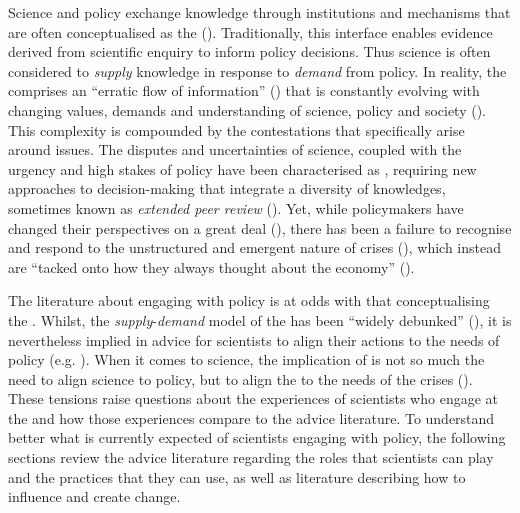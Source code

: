 Science and policy exchange knowledge through institutions and mechanisms that are often conceptualised as the \SPI{} (\cite{JagannathanEtAl2023}). 
Traditionally, this interface enables %
evidence derived from scientific enquiry to inform policy decisions. Thus science is often considered to \emph{supply} knowledge in response to \emph{demand} from policy. 
In reality, the \SPI{} comprises an ``erratic flow of information'' (\cite{BednarekSHG2015}) that is constantly evolving with changing values, demands and understanding of science, policy and society (\cite{Obermeister2020}). 
This complexity is compounded by the contestations that specifically arise around \CAN{} issues.  
The disputes and uncertainties of \CAN{} science, coupled with the urgency and high stakes of \CAN{} policy have been characterised as \PNS, requiring new approaches to decision-making that integrate a diversity of knowledges, sometimes known as \emph{extended peer review} (\cite{FuntowiczR1993,Ravetz1999,Jasanoff2003,Hewitt2024}). 
Yet, while policymakers have changed their perspectives on \CAN{} a great deal (\cite[p118]{Killick2023}), there has been a failure to recognise and respond to the unstructured and emergent nature of \CAN{} crises (\cite{FuntowiczR1993,WesselinkH2020}), which instead are ``tacked onto how they always thought about the economy'' (\cite[p118]{Killick2023}). 

The literature about engaging with policy is at odds with that conceptualising the \CAN{} \SPI. Whilst, the \emph{supply}-\emph{demand} model of the \SPI{} has been ``widely debunked'' (\cite{BoswellS2017}), it is nevertheless implied in advice for scientists to align their actions to the needs of policy (e.g. \cite{McNie2007,GeddesDP2018,BlessenohlS2022,Bisbal2024}). When it comes to \CAN{} science, the implication of \PNS{} is not so much the need to align science to policy, but to align the \SPI{} to the needs of the \CAN{} crises (\cite{BalvaneraJNOBCDGGKKMPSSW2020}). These tensions raise questions about the experiences of scientists who engage at the \CAN{} \SPI{} and how those experiences compare to the advice literature. To understand better what is currently expected of scientists engaging with policy, the following sections review the advice literature regarding the roles that scientists can play and the practices that they can use, as well as literature describing how to influence and create change.

